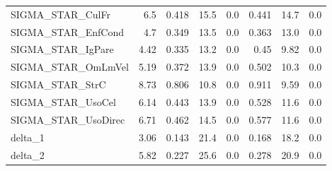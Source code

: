 \begin{tabular}{lrrrrrrr}
SIGMA\_STAR\_CulFr    &     6.5 &    0.418 &    15.5 &      0.0 &         0.441 &         14.7 &           0.0 \\
SIGMA\_STAR\_EnfCond  &     4.7 &    0.349 &    13.5 &      0.0 &         0.363 &         13.0 &           0.0 \\
SIGMA\_STAR\_IgPare   &    4.42 &    0.335 &    13.2 &      0.0 &          0.45 &         9.82 &           0.0 \\
SIGMA\_STAR\_OmLmVel  &    5.19 &    0.372 &    13.9 &      0.0 &         0.502 &         10.3 &           0.0 \\
SIGMA\_STAR\_StrC     &    8.73 &    0.806 &    10.8 &      0.0 &         0.911 &         9.59 &           0.0 \\
SIGMA\_STAR\_UsoCel   &    6.14 &    0.443 &    13.9 &      0.0 &         0.528 &         11.6 &           0.0 \\
SIGMA\_STAR\_UsoDirec &    6.71 &    0.462 &    14.5 &      0.0 &         0.577 &         11.6 &           0.0 \\
delta\_1             &    3.06 &    0.143 &    21.4 &      0.0 &         0.168 &         18.2 &           0.0 \\
delta\_2             &    5.82 &    0.227 &    25.6 &      0.0 &         0.278 &         20.9 &           0.0 \\
\bottomrule
\end{tabular}

